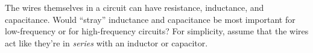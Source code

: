 The wires themselves in a circuit can have resistance,
        inductance, and capacitance. Would ``stray'' inductance and
        capacitance be most important for low-frequency or for
        high-frequency circuits? For simplicity, assume that the
        wires act like they're in \emph{series} with an inductor or capacitor.
